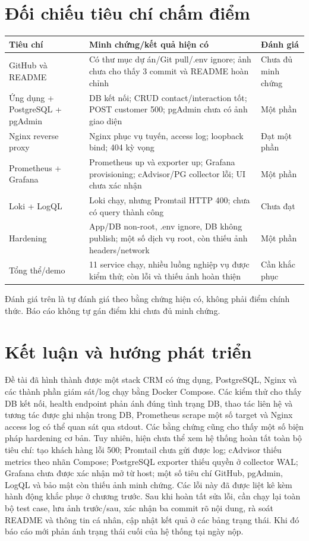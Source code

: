 \documentclass[12pt,a4paper]{report}
\begin{document}
\chapter{Đối chiếu tiêu chí chấm điểm}
\begin{longtable}{p{4cm}p{7cm}p{3cm}}
\toprule
Tiêu chí & Minh chứng/kết quả hiện có & Đánh giá\\
\midrule
GitHub và README & Có thư mục dự án/Git pull/.env ignore; ảnh chưa cho thấy 3 commit và README hoàn chỉnh & Chưa đủ minh chứng\\
Ứng dụng + PostgreSQL + pgAdmin & DB kết nối; CRUD contact/interaction tốt; POST customer 500; pgAdmin chưa có ảnh giao diện & Một phần\\
Nginx reverse proxy & Nginx phục vụ tuyến, access log; loopback bind; 404 kỳ vọng & Đạt một phần\\
Prometheus + Grafana & Prometheus up và exporter up; Grafana provisioning; cAdvisor/PG collector lỗi; UI chưa xác nhận & Một phần\\
Loki + LogQL & Loki chạy, nhưng Promtail HTTP 400; chưa có query thành công & Chưa đạt\\
Hardening & App/DB non-root, .env ignore, DB không publish; một số dịch vụ root, còn thiếu ảnh headers/network & Một phần\\
Tổng thể/demo & 11 service chạy, nhiều luồng nghiệp vụ được kiểm thử; còn lỗi và thiếu ảnh hoàn thiện & Cần khắc phục\\
\bottomrule
\end{longtable}
Đánh giá trên là tự đánh giá theo bằng chứng hiện có, không phải điểm chính thức. Báo cáo không tự gán điểm khi chưa đủ minh chứng.

\chapter{Kết luận và hướng phát triển}
Đề tài đã hình thành được một stack CRM có ứng dụng, PostgreSQL, Nginx và các thành phần giám sát/log chạy bằng Docker Compose. Các kiểm thử cho thấy DB kết nối, health endpoint phản ánh đúng tình trạng DB, thao tác liên hệ và tương tác được ghi nhận trong DB, Prometheus scrape một số target và Nginx access log có thể quan sát qua stdout. Các bằng chứng cũng cho thấy một số biện pháp hardening cơ bản.
Tuy nhiên, hiện chưa thể xem hệ thống hoàn tất toàn bộ tiêu chí: tạo khách hàng lỗi 500; Promtail chưa gửi được log; cAdvisor thiếu metrics theo nhãn Compose; PostgreSQL exporter thiếu quyền ở collector WAL; Grafana chưa được xác nhận mở từ host; một số tiêu chí GitHub, pgAdmin, LogQL và bảo mật còn thiếu ảnh minh chứng. Các lỗi này đã được liệt kê kèm hành động khắc phục ở chương trước.
Sau khi hoàn tất sửa lỗi, cần chạy lại toàn bộ test case, lưu ảnh trước/sau, xác nhận ba commit rõ nội dung, rà soát README và thông tin cá nhân, cập nhật kết quả ở các bảng trạng thái. Khi đó báo cáo mới phản ánh trạng thái cuối của hệ thống tại ngày nộp.
\end{document}
